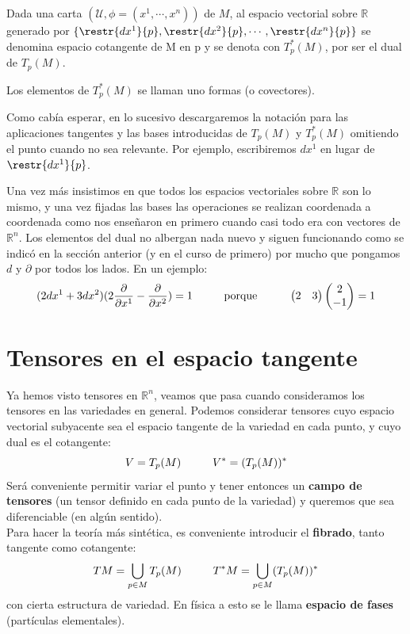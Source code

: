 \documentclass[palatino, bibnumbers]{apuntes}
\begin{document}
\begin{defn} Dada una carta $(\mathcal{U},\phi=(x^1,\cdots,x^n))$ de $M$, al espacio vectorial sobre $ℝ$ generado por $\{\restr{dx^1}{p},\restr{dx^2}{p},\cdots,\restr{dx^n}{p}\}$ se denomina espacio cotangente de M en p y se denota con $T_p^{*}(M)$, por ser el dual de $T_p(M)$.
\end{defn}

\begin{defn} Los elementos de $T_p^{*}(M)$ se llaman uno formas (o covectores).
\end{defn}

Como cabía esperar, en lo sucesivo descargaremos la notación para las aplicaciones tangentes y las bases introducidas de $T_p(M)$ y $T_p^{*}(M)$ omitiendo el punto cuando no sea relevante. Por ejemplo, escribiremos $dx^1$ en lugar de $\restr{dx^1}{p}$.

Una vez más insistimos en que todos los espacios vectoriales sobre $ℝ$ son lo mismo, y una vez fijadas las bases las operaciones se realizan coordenada a coordenada como nos enseñaron en primero cuando casi todo era con vectores de $ℝ^{n}$. Los elementos del dual no albergan nada nuevo y siguen funcionando como se indicó en la sección anterior (y en el curso de primero) por mucho que pongamos $d$ y $\partial$ por todos los lados. En un ejemplo: \\ $$(2dx^1+3dx^2)(2\pdv{}{x^1}-\pdv{}{x^2})=1 \hspace*{1cm}\text{porque}\hspace*{1cm} \begin{pmatrix}2&3\end{pmatrix}\begin{pmatrix}2\\-1\end{pmatrix}=1$$
\newpage
\section{Tensores en el espacio tangente}
Ya hemos visto tensores en $ℝ^{n}$, veamos que pasa cuando consideramos los tensores en las variedades en general. Podemos considerar tensores cuyo espacio vectorial subyacente sea el espacio tangente de la variedad en cada punto, y cuyo dual es el cotangente: $$V=T_p(M)\hspace*{1cm} V^*=(T_p(M))^*$$
Será conveniente permitir variar el punto y tener entonces un \textbf{campo de tensores} (un tensor definido en cada punto de la variedad) y queremos que sea diferenciable (en algún sentido).\\ 
Para hacer la teoría más sintética, es conveniente introducir el \textbf{fibrado}, tanto tangente como cotangente: $$TM=\bigcup\limits_{p\in M} T_p(M)\hspace*{1cm} T^*M=\bigcup\limits_{p\in M} (T_p(M))^* $$ con cierta estructura de variedad. En física a esto se le llama \textbf{espacio de fases} (partículas elementales).
\end{document}

